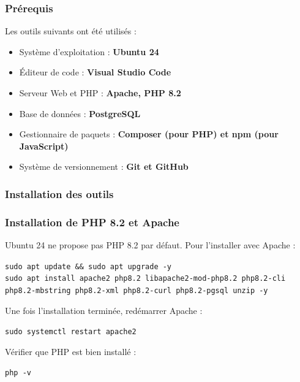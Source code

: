 \subsubsection{Prérequis}
Les outils suivants ont été utilisés :
\begin{itemize}
    \item Système d'exploitation : \textbf{Ubuntu 24}
    \item Éditeur de code : \textbf{Visual Studio Code}
    \item Serveur Web et PHP : \textbf{Apache, PHP 8.2}
    \item Base de données : \textbf{PostgreSQL}
    \item Gestionnaire de paquets : \textbf{Composer (pour PHP) et npm (pour JavaScript)}
    \item Système de versionnement : \textbf{Git et GitHub}
\end{itemize}

\subsubsection{Installation des outils}

\subsubsection*{Installation de PHP 8.2 et Apache}
Ubuntu 24 ne propose pas PHP 8.2 par défaut. Pour l'installer avec Apache :
\begin{tcolorbox}[colback=black, coltext=white, title=Installation de PHP 8.2 et Apache, fonttitle=\bfseries]
\texttt{sudo apt update \&\& sudo apt upgrade -y} \\
\texttt{sudo apt install apache2 php8.2 libapache2-mod-php8.2 php8.2-cli php8.2-mbstring php8.2-xml php8.2-curl php8.2-pgsql unzip -y}
\end{tcolorbox}

Une fois l'installation terminée, redémarrer Apache :

\begin{tcolorbox}[colback=black, coltext=white, title=Redémarrage du serveur Apache, fonttitle=\bfseries]
\texttt{sudo systemctl restart apache2}
\end{tcolorbox}

Vérifier que PHP est bien installé :

\begin{tcolorbox}[colback=black, coltext=white, title=Vérification de la version de PHP, fonttitle=\bfseries]
\texttt{php -v}
\end{tcolorbox}

